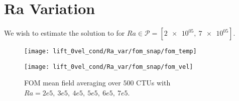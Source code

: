 \graphicspath{{/Users/bigticket0501/MOR_cases/trombe_wall/Pr_7.2/}}

\section{Ra Variation}
We wish to estimate the solution to for $Ra \in \mathcal{P} =
[\num{2e+05},~\num{7e+05}]$.
\begin{figure}[h!]
    \begin{minipage}[b]{.5\linewidth}
   \centering 
   \texttt{[image: lift\_0vel\_cond/Ra\_var/fom\_snap/fom\_temp]}
    \end{minipage}%
    \begin{minipage}[b]{.5\linewidth}
   \centering 
   \texttt{[image: lift\_0vel\_cond/Ra\_var/fom\_snap/fom\_vel]}
    \end{minipage}%
   \caption{FOM mean field averaging over $500$ CTUs with $Ra=2e5,~3e5,~4e5,~5e5,~6e5,~7e5$.}
\label{fig:slot_pr_7.2_fom_mean} \end{figure}
